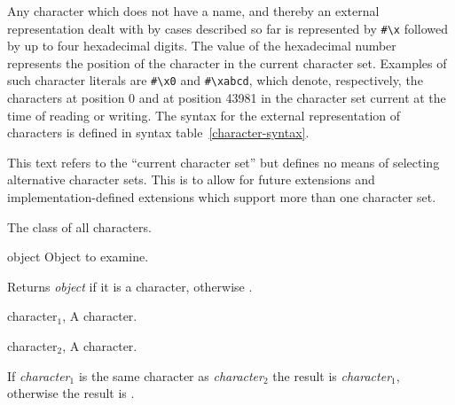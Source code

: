 \begin{optDefinition}
Any character which does not have a name, and thereby an external representation
dealt with by cases described so far is represented by \verb+#\x+ followed by up
to four hexadecimal digits.  The value of the hexadecimal number represents the
position of the character in the current character set.  Examples of such
character literals are \verb+#\x0+ and \verb+#\xabcd+, which denote,
respectively, the characters at position 0 and at position 43981 in the
character set current at the time of reading or writing.  The syntax for the
external representation of characters is defined in
syntax table~\ref{character-syntax}.
%
\begin{note}
    This text refers to the ``current character set'' but defines no means of
    selecting alternative character sets.  This is to allow for future
    extensions and implementation-defined extensions which support more than one
    character set.
\end{note}

%
The class of all characters.

%
\begin{arguments}
    \item[{object}] Object to examine.
\end{arguments}
%
\result%
Returns {\em object\/} if it is a character, otherwise \nil{}.

%
\begin{specargs}
    \item[character$_1$, \classref{character}] A character.
    \item[character$_2$, \classref{character}] A character.
\end{specargs}
%
\result%
If {\em character$_1$\/} is the same character as {\em character$_2$\/} the
result is {\em character$_1$}, otherwise the result is \nil{}.


\end{optDefinition}
